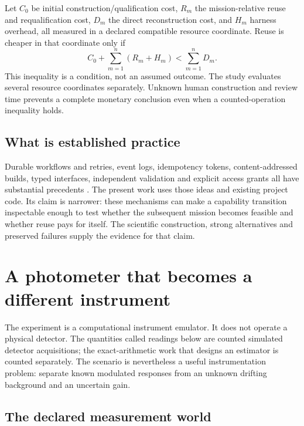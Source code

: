 \documentclass[11pt]{article}
\begin{document}
Let $C_0$ be initial construction/qualification cost, $R_m$ the mission-relative reuse and requalification cost, $D_m$ the direct reconstruction cost, and $H_m$ harness overhead, all measured in a declared compatible resource coordinate. Reuse is cheaper in that coordinate only if
\begin{equation}
C_0+\sum_{m=1}^{n}(R_m+H_m)<\sum_{m=1}^{n}D_m.
\label{eq:breakeven}
\end{equation}
This inequality is a condition, not an assumed outcome. The study evaluates several resource coordinates separately. Unknown human construction and review time prevents a complete monetary conclusion even when a counted-operation inequality holds.

\subsection{What is established practice}

Durable workflows and retries, event logs, idempotency tokens, content-addressed builds, typed interfaces, independent validation and explicit access grants all have substantial precedents \cite{temporal,awsidempotency,buildsystems,pcc,prov,sqlite}. The present work uses those ideas and existing project code. Its claim is narrower: these mechanisms can make a capability transition inspectable enough to test whether the subsequent mission becomes feasible and whether reuse pays for itself. The scientific construction, strong alternatives and preserved failures supply the evidence for that claim.



\section{A photometer that becomes a different instrument}
\label{sec:instrument}

The experiment is a computational instrument emulator. It does not operate a physical detector. The quantities called readings below are counted simulated detector acquisitions; the exact-arithmetic work that designs an estimator is counted separately. The scenario is nevertheless a useful instrumentation problem: separate known modulated responses from an unknown drifting background and an uncertain gain.

\subsection{The declared measurement world}
\end{document}
